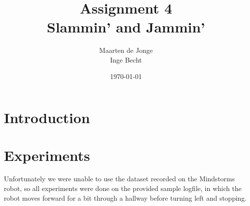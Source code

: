 \documentclass[a4paper, 20pt]{article}
\author{Maarten de Jonge \\
    Inge Becht}
\date{\today}
\title{Assignment 4\\ 
Slammin' and Jammin'}
\begin{document}
\maketitle
\section{Introduction}

\section{Experiments}
Unfortunately we were unable to use the dataset recorded on the Mindstorms
robot, so all experiments were done on the provided sample logfile, in which the
robot moves forward for a bit through a hallway before turning left and
stopping.
\end{document}

